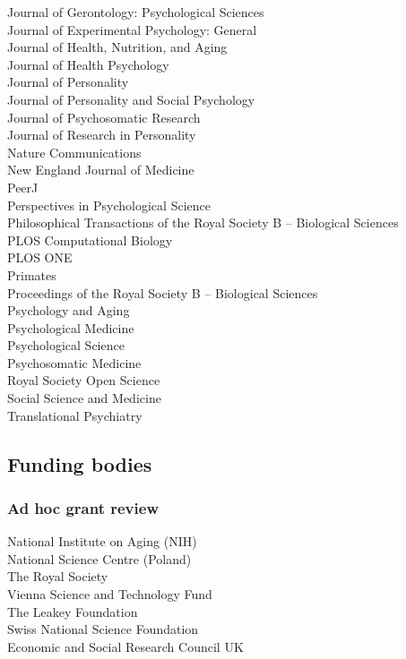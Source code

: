 \documentclass[11pt]{article}
\begin{document}
\begin{minipage}[t]{0.49\linewidth}
  Journal of Gerontology: Psychological Sciences \\
  Journal of Experimental Psychology: General \\
  Journal of Health, Nutrition, and Aging \\
  Journal of Health Psychology \\
  Journal of Personality \\
  Journal of Personality and Social Psychology \\
  Journal of Psychosomatic Research \\
  Journal of Research in Personality \\
  Nature Communications \\
  New England Journal of Medicine \\
  PeerJ \\
  Perspectives in Psychological Science \\
  Philosophical Transactions of the Royal Society B -- Biological Sciences \\
  PLOS Computational Biology \\
  PLOS ONE \\
  Primates \\
  Proceedings of the Royal Society B -- Biological Sciences \\
  Psychology and Aging \\
  Psychological Medicine \\
  Psychological Science \\
  Psychosomatic Medicine \\
  Royal Society Open Science \\
  Social Science and Medicine \\
  Translational Psychiatry
\end{minipage}

\subsection*{Funding bodies}

\subsubsection*{Ad hoc grant review}
National Institute on Aging (NIH) \\
National Science Centre (Poland) \\
The Royal Society \\
Vienna Science and Technology Fund \\
The Leakey Foundation \\
Swiss National Science Foundation \\
Economic and Social Research Council UK
\end{document}

